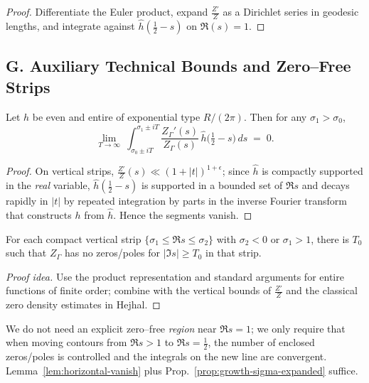 \begin{proof}
Differentiate the Euler product, expand $\frac{Z'}{Z}$ as a Dirichlet series in geodesic lengths, and integrate against $\hat h(\tfrac12-s)$ on $\Re(s)=1$.
\end{proof}


\subsection*{G. Auxiliary Technical Bounds and Zero–Free Strips}
\label{subsec:aux-bounds-expanded}

\begin{lemma}
\label{lem:horizontal-vanish}
Let $h$ be even and entire of exponential type $R/(2\pi)$. Then for any $\sigma_1>\sigma_0$,
\[
 \lim_{T\to\infty}\ \int_{\sigma_0\pm iT}^{\sigma_1\pm iT}
 \frac{Z_\Gamma'(s)}{Z_\Gamma(s)}\,\hat h\!\Big(\tfrac12-s\Big)\,ds \;=\; 0.
\]
\end{lemma}

\begin{proof}
On vertical strips, $\frac{Z'}{Z}(s)\ll (1+|t|)^{1+\epsilon}$; since $\hat h$ is compactly supported in the \emph{real} variable, $\hat h(\tfrac12-s)$ is supported in a bounded set of $\Re s$ and decays rapidly in $|t|$ by repeated integration by parts in the inverse Fourier transform that constructs $h$ from $\hat h$. Hence the segments vanish.
\end{proof}

\begin{lemma}
\label{lem:zero-free-qual}
For each compact vertical strip $\{ \sigma_1\le \Re s\le \sigma_2\}$ with $\sigma_2<0$ or $\sigma_1>1$, there is $T_0$ such that $Z_\Gamma$ has no zeros/poles for $|\Im s|\ge T_0$ in that strip. 
\end{lemma}

\begin{proof}[Proof idea]
Use the product representation and standard arguments for entire functions of finite order; combine with the vertical bounds of $\frac{Z'}{Z}$ and the classical zero density estimates in Hejhal.
\end{proof}

\begin{remark}
We do not need an explicit zero–free \emph{region} near $\Re s=1$; we only require that when moving contours from $\Re s>1$ to $\Re s=\tfrac12$, the number of enclosed zeros/poles is controlled and the integrals on the new line are convergent. Lemma~\ref{lem:horizontal-vanish} plus Prop.~\ref{prop:growth-sigma-expanded} suffice.
\end{remark}

